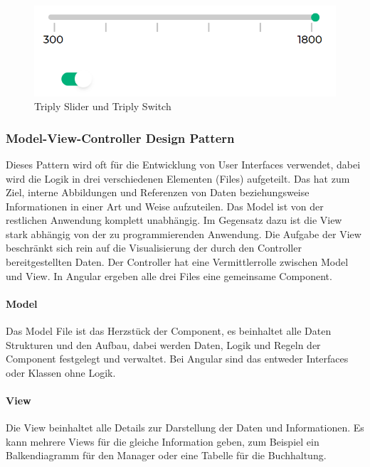 \begin{figure}[hbt!]
    \centering
    \includegraphics[scale=1]{pics/triply-material-library}
    \caption{Triply Slider und Triply Switch}
    \label{fig:triply-material-library}
\end{figure}

\subsubsection{Model-View-Controller Design Pattern}
Dieses Pattern wird oft für die Entwicklung von User Interfaces verwendet,
dabei wird die Logik in drei verschiedenen Elementen (Files) aufgeteilt.
Das hat zum Ziel, interne Abbildungen und Referenzen von Daten beziehungsweise Informationen
in einer Art und Weise aufzuteilen.
Das Model ist von der restlichen Anwendung komplett
unabhängig.
Im Gegensatz dazu ist die View stark abhängig von der zu programmierenden Anwendung.
Die Aufgabe der View beschränkt sich rein auf die Visualisierung der durch den Controller bereitgestellten Daten.
Der Controller hat eine Vermittlerrolle zwischen Model und View.
In Angular ergeben alle drei Files eine gemeinsame Component.

\paragraph{Model}
Das Model File ist das Herzstück der Component, es beinhaltet alle Daten
Strukturen und den Aufbau, dabei werden Daten, Logik und Regeln
der Component festgelegt und verwaltet.
Bei Angular sind das entweder Interfaces oder Klassen ohne Logik.
~\cite{angular-design-patterns}

\paragraph{View}
Die View beinhaltet alle Details zur Darstellung der Daten und Informationen.
Es kann mehrere Views für die gleiche Information geben, zum Beispiel ein
Balkendiagramm für den Manager oder eine Tabelle für die Buchhaltung.

